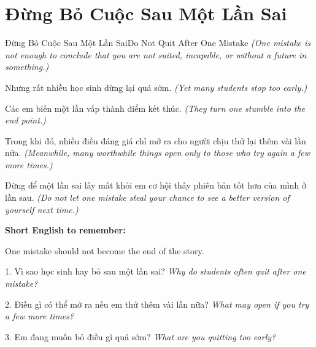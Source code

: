 \section{Đừng Bỏ Cuộc Sau Một Lần Sai}
\begin{truyen}{Đừng Bỏ Cuộc Sau Một Lần Sai}{Do Not Quit After One Mistake}
\textit{(One mistake is not enough to conclude that you are not suited, incapable, or without a future in something.)}

Nhưng rất nhiều học sinh dừng lại quá sớm.
\textit{(Yet many students stop too early.)}

Các em biến một lần vấp thành điểm kết thúc.
\textit{(They turn one stumble into the end point.)}

Trong khi đó, nhiều điều đáng giá chỉ mở ra cho người chịu thử lại thêm vài lần nữa.
\textit{(Meanwhile, many worthwhile things open only to those who try again a few more times.)}
\end{truyen}

\begin{baihoc}
Đừng để một lần sai lấy mất khỏi em cơ hội thấy phiên bản tốt hơn của mình ở lần sau.
\textit{(Do not let one mistake steal your chance to see a better version of yourself next time.)}
\end{baihoc}

\begin{ghinhoanh}
\textbf{Short English to remember:}

One mistake should not become the end of the story.

\end{ghinhoanh}

\begin{tuhocnhanh}
1. Vì sao học sinh hay bỏ sau một lần sai? \textit{Why do students often quit after one mistake?}

2. Điều gì có thể mở ra nếu em thử thêm vài lần nữa? \textit{What may open if you try a few more times?}

3. Em đang muốn bỏ điều gì quá sớm? \textit{What are you quitting too early?}
\end{tuhocnhanh}
\ngancach

